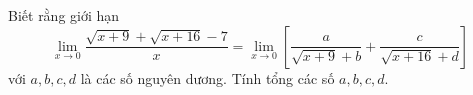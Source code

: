 \begin{ex}
Biết rằng giới hạn \[\lim\limits_{x\to0}\dfrac{\sqrt{x+9}+\sqrt{x+16}-7}x=\lim\limits_{x\to0}\left[\dfrac a{\sqrt{x+9}+b}+\dfrac c{\sqrt{x+16}+d}\right]\] với $a,b,c,d$ là các số nguyên dương. Tính tổng các số $a,b,c,d$.
\end{ex}
